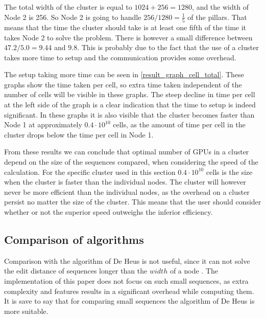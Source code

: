The total width of the cluster is equal to $1024 + 256 = 1280$, and the width of Node 2 is 256.
So Node 2 is going to handle $256 / 1280 = \frac{1}{5}$ of the pillars.
That means that the time the cluster should take is at least one fifth of the time it takes Node 2 to solve the problem.
There is however a small difference between $47.2 / 5.0 = 9.44$ and $9.8$.
This is probably due to the fact that the use of a cluster takes more time to setup and the communication provides some overhead.

The setup taking more time can be seen in \cref{result_graph_cell_total}.
These graphs show the time taken per cell, so extra time taken independent of the number of cells will be visible in these graphs.
The steep decline in time per cell at the left side of the graph is a clear indication that the time to setup is indeed significant.
In these graphs it is also visible that the cluster becomes faster than Node 1 at approximately $0.4 \cdot 10^{10}$ cells, as the amount of time per cell in the cluster drops below the time per cell in Node 1.

From these results we can conclude that optimal number of GPUs in a cluster depend on the size of the sequences compared, when considering the speed of the calculation.
For the specific cluster used in this section $0.4 \cdot 10^{10}$ cells is the size when the cluster is faster than the individual nodes.
The cluster will however never be more efficient than the individual nodes, as the overhead on a cluster persist no matter the size of the cluster.
This means that the user should consider whether or not the superior speed outweighs the inferior efficiency.

\subsection{Comparison of algorithms}
Comparison with the algorithm of De Heus is not useful, since it can not solve the edit distance of sequences longer than the $width$ of a node \cite{Heus}.
The implementation of this paper does not focus on such small sequences, as extra complexity and features results in a significant overhead while computing them.
It is save to say that for comparing small sequences the algorithm of De Heus is more suitable.


\begin{comment}
\subsection{Comparison with CPU implementations}
Comparing the implementation with CPU based algorithms is also not useful, as there is no reliable method to compare the performance of CPUs with GPUs apart from running the implementation on each of them.
The difference between CPUs and GPUs is significantly

A more expensive device will not necessarily have a better performance, so even the cost does not serve as a reliable benchmark.

Even the cost of the devices is not a reliable benchmark as manufacturers do not publish the production cost of a device and use different profit margins.
That is why no such comparison is included.
\end{comment}
